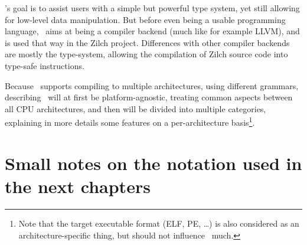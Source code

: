 \vspace{\baselineskip}

\nstar's goal is to assist users with a simple but powerful type system, yet still allowing for low-level data manipulation.
But before even being a usable programming language, \nstar\ aims at being a compiler backend (much like for example LLVM), and is used that way in the Zilch project. Differences with other compiler backends are mostly the type-system, allowing the compilation of Zilch source code into type-safe instructions.

\vspace{\baselineskip}

Because \nstar\ supports compiling to multiple architectures, using different grammars, describing \nstar\ will at first be platform-agnostic, treating common aspects between all CPU architectures, and then will be divided into multiple categories, explaining in more details some features on a per-architecture basis\footnote{Note that the target executable format (ELF, PE, \ldots) is also considered as an architecture-specific thing, but should not influence \nstar\ much.}.

\section*{Small notes on the notation used in the next chapters}\label{sec:nstar-abstract-notation}

